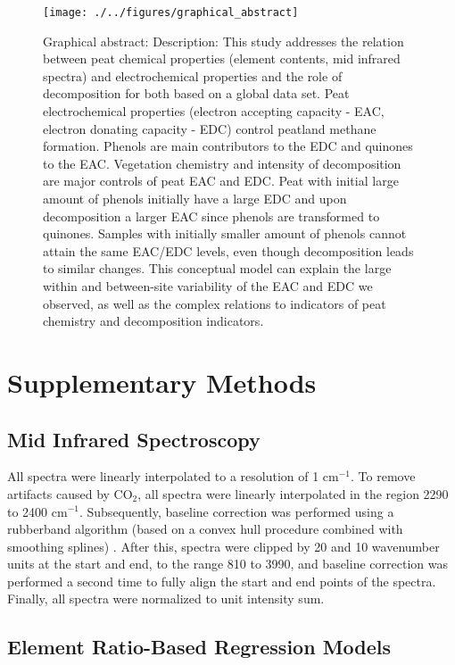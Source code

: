 \documentclass[draft,linenumbers]{agujournal2018}
\begin{document}
\begin{figure}[H]

{\centering \texttt{[image: ./../figures/graphical\_abstract]} 

}

\caption{Graphical abstract: Description: This study addresses the relation between peat chemical properties (element contents, mid infrared spectra) and electrochemical properties and the role of decomposition for both based on a global data set. Peat electrochemical properties (electron accepting capacity - EAC, electron donating capacity - EDC) control peatland methane formation. Phenols are main contributors to the EDC and quinones to the EAC. Vegetation chemistry and intensity of decomposition are major controls of peat EAC and EDC. Peat with initial large amount of phenols initially have a large EDC and upon decomposition a larger EAC since phenols are transformed to quinones. Samples with initially smaller amount of phenols cannot attain the same EAC/EDC levels, even though decomposition leads to similar changes. This conceptual model can explain the large within and between-site variability of the EAC and EDC we observed, as well as the complex relations to indicators of peat chemistry and decomposition indicators.}\label{fig:graphical-abstract}
\end{figure}

\section{Supplementary Methods}

\subsection{Mid Infrared Spectroscopy}

All spectra were linearly interpolated to a resolution of 1 cm\(^{-1}\).
To remove artifacts caused by CO\(_2\), all spectra were linearly
interpolated in the region 2290 to 2400 cm\(^{-1}\). Subsequently,
baseline correction was performed using a rubberband algorithm (based on
a convex hull procedure combined with smoothing splines)
\citep{Beleites.2020}. After this, spectra were clipped by 20 and 10
wavenumber units at the start and end, to the range 810 to
\SI{3990}{\wn}, and baseline correction was performed a second time to
fully align the start and end points of the spectra. Finally, all
spectra were normalized to unit intensity sum.

\subsection{Element Ratio-Based Regression Models}
\end{document}
